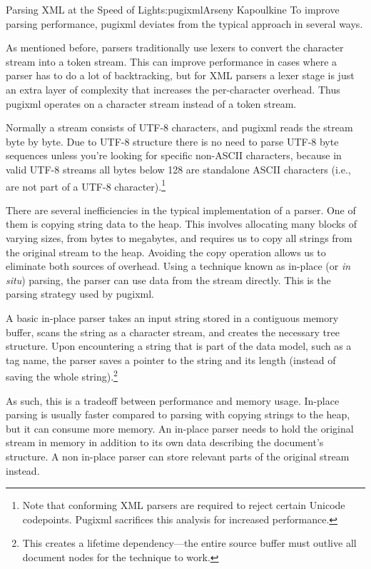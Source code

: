 \begin{aosachapter}{Parsing XML at the Speed of Light}{s:pugixml}{Arseny Kapoulkine}
To improve parsing performance, pugixml deviates from the typical
approach in several ways.


As mentioned before, parsers traditionally use lexers to convert the
character stream into a token stream. This can improve performance in
cases where a parser has to do a lot of backtracking, but for XML
parsers a lexer stage is just an extra layer of complexity that
increases the per-character overhead. Thus pugixml operates on a
character stream instead of a token stream.

Normally a stream consists of UTF-8 characters, and pugixml reads the
stream byte by byte. Due to UTF-8 structure there is no need to parse
UTF-8 byte sequences unless you're looking for specific non-ASCII
characters, because in valid UTF-8 streams all bytes below 128 are
standalone ASCII characters (i.e., are not part of a UTF-8
character).\footnote{Note that conforming XML parsers are required to
  reject certain Unicode codepoints. Pugixml sacrifices this analysis
  for increased performance.}


There are several inefficiencies in the typical implementation of a
parser. One of them is copying string data to the heap. This involves
allocating many blocks of varying sizes, from bytes to megabytes, and
requires us to copy all strings from the original stream to the heap.
Avoiding the copy operation allows us to eliminate both sources of
overhead. Using a technique known as in-place (or \emph{in situ})
parsing, the parser can use data from the stream directly. This is the
parsing strategy used by pugixml.

A basic in-place parser takes an input string stored in a contiguous
memory buffer, scans the string as a character stream, and creates the
necessary tree structure. Upon encountering a string that is part of the
data model, such as a tag name, the parser saves a pointer to the string
and its length (instead of saving the whole string).\footnote{This
  creates a lifetime dependency---the entire source buffer must outlive
  all document nodes for the technique to work.}

As such, this is a tradeoff between performance and memory usage.
In-place parsing is usually faster compared to parsing with copying
strings to the heap, but it can consume more memory. An in-place parser
needs to hold the original stream in memory in addition to its own data
describing the document's structure. A non in-place parser can store
relevant parts of the original stream instead.


\end{aosachapter}
